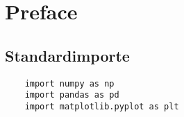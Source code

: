 
\section{Preface}

\subsection{Standardimporte}
\begin{verbatim}
    import numpy as np
    import pandas as pd
    import matplotlib.pyplot as plt       
\end{verbatim}
